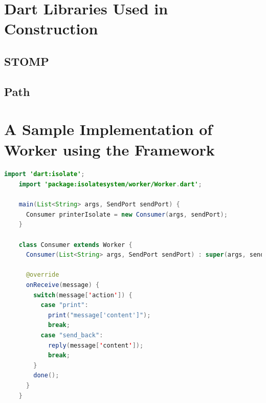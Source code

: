 \section{Dart Libraries Used in Construction}
  \subsection{STOMP}
  \subsection{Path}
  \subsection{}

\section{A Sample Implementation of Worker using the Framework}
\begin{lstlisting}[language=java,firstnumber=1]
    import 'dart:isolate';
    import 'package:isolatesystem/worker/Worker.dart';

    main(List<String> args, SendPort sendPort) {
      Consumer printerIsolate = new Consumer(args, sendPort);
    }

    class Consumer extends Worker {
      Consumer(List<String> args, SendPort sendPort) : super(args, sendPort);

      @override
      onReceive(message) {
        switch(message['action']) {
          case "print":
            print("message['content']");
            break;
          case "send_back":
            reply(message['content']);
            break;
        }
        done();
      }
    }

\end{lstlisting}
